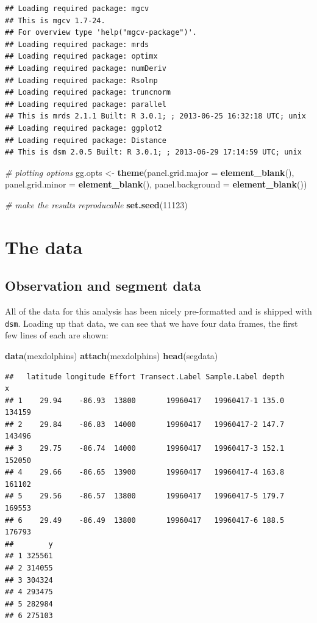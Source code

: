 \documentclass[]{amsart}
\newenvironment{Shaded}{}{}
\newcommand{\KeywordTok}[1]{\textcolor[rgb]{0.00,0.44,0.13}{\textbf{{#1}}}}
\newcommand{\DataTypeTok}[1]{\textcolor[rgb]{0.56,0.13,0.00}{{#1}}}
\newcommand{\DecValTok}[1]{\textcolor[rgb]{0.25,0.63,0.44}{{#1}}}
\newcommand{\StringTok}[1]{\textcolor[rgb]{0.25,0.44,0.63}{{#1}}}
\newcommand{\CommentTok}[1]{\textcolor[rgb]{0.38,0.63,0.69}{\textit{{#1}}}}
\newcommand{\NormalTok}[1]{{#1}}
\begin{document}
\begin{verbatim}
## Loading required package: mgcv 
## This is mgcv 1.7-24. 
## For overview type 'help("mgcv-package")'.
## Loading required package: mrds 
## Loading required package: optimx
## Loading required package: numDeriv
## Loading required package: Rsolnp
## Loading required package: truncnorm
## Loading required package: parallel
## This is mrds 2.1.1 Built: R 3.0.1; ; 2013-06-25 16:32:18 UTC; unix 
## Loading required package: ggplot2 
## Loading required package: Distance 
## This is dsm 2.0.5 Built: R 3.0.1; ; 2013-06-29 17:14:59 UTC; unix
\end{verbatim}

\begin{Shaded}
\begin{Highlighting}[]

\CommentTok{# plotting options}
\NormalTok{gg.opts <-}\StringTok{ }\KeywordTok{theme}\NormalTok{(}\DataTypeTok{panel.grid.major =} \KeywordTok{element_blank}\NormalTok{(), }
\DataTypeTok{panel.grid.minor =} \KeywordTok{element_blank}\NormalTok{(), }
    \DataTypeTok{panel.background =} \KeywordTok{element_blank}\NormalTok{())}

\CommentTok{# make the results reproducable}
\KeywordTok{set.seed}\NormalTok{(}\DecValTok{11123}\NormalTok{)}
\end{Highlighting}
\end{Shaded}

\section{The data}

\subsection{Observation and segment data}

All of the data for this analysis has been nicely pre-formatted and is
shipped with \texttt{dsm}. Loading up that data, we can see that we have
four data frames, the first few lines of each are shown:

\begin{Shaded}
\begin{Highlighting}[]
\KeywordTok{data}\NormalTok{(mexdolphins)}
\KeywordTok{attach}\NormalTok{(mexdolphins)}
\KeywordTok{head}\NormalTok{(segdata)}
\end{Highlighting}
\end{Shaded}

\begin{verbatim}
##   latitude longitude Effort Transect.Label Sample.Label depth      x
## 1    29.94    -86.93  13800       19960417   19960417-1 135.0 134159
## 2    29.84    -86.83  14000       19960417   19960417-2 147.7 143496
## 3    29.75    -86.74  14000       19960417   19960417-3 152.1 152050
## 4    29.66    -86.65  13900       19960417   19960417-4 163.8 161102
## 5    29.56    -86.57  13800       19960417   19960417-5 179.7 169553
## 6    29.49    -86.49  13800       19960417   19960417-6 188.5 176793
##        y
## 1 325561
## 2 314055
## 3 304324
## 4 293475
## 5 282984
## 6 275103
\end{verbatim}
\end{document}
